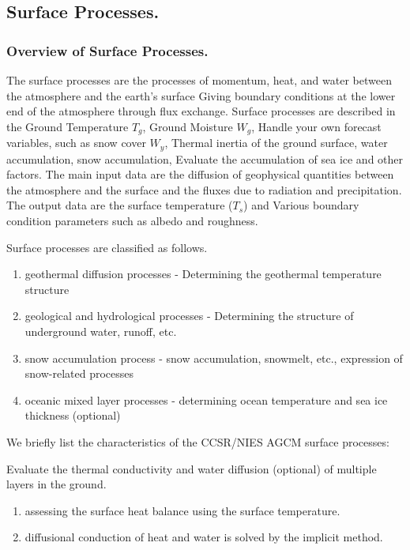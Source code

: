 \hypertarget{surface-processes.}{%
\subsection{Surface Processes.}\label{surface-processes.}}

\hypertarget{overview-of-surface-processes.}{%
\subsubsection{Overview of Surface
Processes.}\label{overview-of-surface-processes.}}

The surface processes are the processes of momentum, heat, and water
between the atmosphere and the earth's surface Giving boundary
conditions at the lower end of the atmosphere through flux exchange.
Surface processes are described in the Ground Temperature \(T_g\),
Ground Moisture \(W_g\), Handle your own forecast variables, such as
snow cover \(W_y\), Thermal inertia of the ground surface, water
accumulation, snow accumulation, Evaluate the accumulation of sea ice
and other factors. The main input data are the diffusion of geophysical
quantities between the atmosphere and the surface and the fluxes due to
radiation and precipitation. The output data are the surface temperature
(\(T_s\)) and Various boundary condition parameters such as albedo and
roughness.

Surface processes are classified as follows.

\begin{enumerate}
\def\labelenumi{\arabic{enumi}.}
\item
  geothermal diffusion processes - Determining the geothermal
  temperature structure
\item
  geological and hydrological processes - Determining the structure of
  underground water, runoff, etc.
\item
  snow accumulation process - snow accumulation, snowmelt, etc.,
  expression of snow-related processes
\item
  oceanic mixed layer processes - determining ocean temperature and sea
  ice thickness (optional)
\end{enumerate}

We briefly list the characteristics of the CCSR/NIES AGCM surface
processes:

Evaluate the thermal conductivity and water diffusion (optional) of
multiple layers in the ground.

\begin{enumerate}
\def\labelenumi{\arabic{enumi}.}
\setcounter{enumi}{1}
\item
  assessing the surface heat balance using the surface temperature.
\item
  diffusional conduction of heat and water is solved by the implicit
  method.
\end{enumerate}

